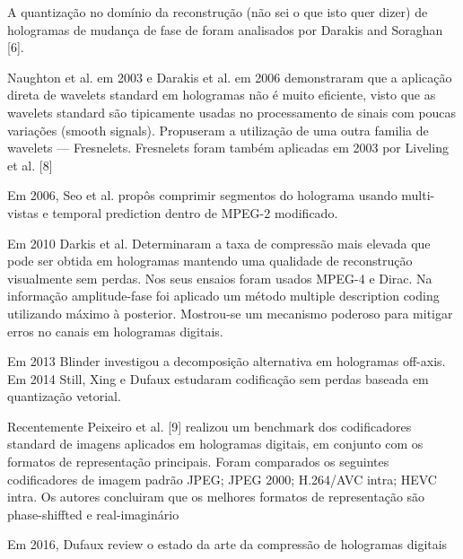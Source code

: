 A quantização no domínio da reconstrução (não sei o que isto quer dizer) de hologramas de mudança de fase de foram analisados por Darakis and Soraghan [6].

Naughton et al. em 2003 e Darakis et al. em 2006 demonstraram que a aplicação direta de wavelets standard em hologramas não é muito eficiente, visto que as wavelets standard são tipicamente usadas no processamento de sinais com poucas variações (smooth signals). Propuseram a utilização de uma outra familia de wavelets — Fresnelets. Fresnelets foram também aplicadas em 2003 por Liveling et al. [8]

Em 2006, Seo et al. propôs comprimir segmentos do holograma usando multi-vistas e temporal prediction dentro de MPEG-2 modificado.

Em 2010 Darkis et al. Determinaram a taxa de compressão mais elevada que pode ser obtida em hologramas mantendo uma qualidade de reconstrução visualmente sem perdas. Nos seus ensaios foram usados MPEG-4 e Dirac. Na informação amplitude-fase foi aplicado um método multiple description coding utilizando máximo à posterior. Mostrou-se um mecanismo poderoso para mitigar erros no canais em hologramas digitais.

Em 2013 Blinder investigou a decomposição alternativa em hologramas off-axis.
Em 2014 Still, Xing e Dufaux estudaram codificação sem perdas baseada em quantização vetorial. 

Recentemente Peixeiro et al. [9] realizou um benchmark dos codificadores standard de imagens aplicados em hologramas digitais, em conjunto com os formatos de representação principais. Foram comparados os seguintes codificadores de imagem padrão
  JPEG;
  JPEG 2000;
  H.264/AVC intra;
  HEVC intra.
Os autores concluiram que os melhores formatos de representação são phase-shiffted e real-imaginário

Em 2016, Dufaux review o estado da arte da compressão de hologramas digitais

